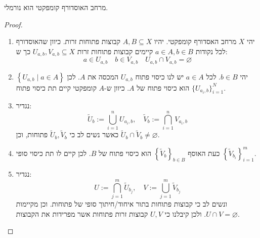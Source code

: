 \documentclass{tstextbook}
\begin{document}
\begin{proposition}
מרחב האוסדורף קומפקטי הוא נורמלי.

\end{proposition}
\begin{proof}
  \begin{enumerate}
    \item יהי \(X\) מרחב האסדורף קומפקטי. יהיו \(A,B\subseteq X\) קבוצות פתוחות זרות. כיוון שהאוסדורף לכל נקודות \(a\in A,b \in B\) קיימים קבוצות פתוחות זרות \(U_{a,b},V_{a,b}\subseteq X\) כך ש: 
$$a\in U_{a,b}\quad b\in V_{a,b}\quad U_{a,b}\cap V_{a,b}=\varnothing $$


    \item יהי \(b \in B\). לכל \(a \in A\) יש לנו כיסוי פתוח \(U_{a,b}\) המכסה את \(A\). לכן \(\left\{  U_{a,b}\mid a \in A  \right\}\) הוא כיסוי פתוח של \(A\). כיוון ש-\(A\) קומפקטי קיים תת כיסוי פתוח \(\{ U_{a_{i},b} \}_{i=1}^{N}\).  


    \item נגדיר: 
$$\tilde{U}_{b}:=\bigcup_{i=1}^{n}U_{a_{i},b},\quad\tilde{V}_{b}:=\bigcap_{i=1}^{n}V_{a_{i},b}$$
כאשר נשים לב כי \(\tilde{U}_{b},\tilde{V}_{b}\) פתוחות, וכן \(\tilde{U}_{b}\cap \tilde{V}_{b}\neq \varnothing\).


    \item כעת האוסף \(\left\{  \tilde{V}_{b}  \right\}_{b \in B}\) הוא כיסוי פתוח של \(B\). לכן קיים לו תת כיסוי סופי \(\left\{  \tilde{V}_{b_{i}}  \right\}_{i=1}^{m}\). 


    \item נגדיר: 
$$U:=\bigcap_{j=1}^{m}\tilde{U}_{b_{j}},\quad V:=\bigcup_{j=1}^{m}\tilde{V}_{b_{j}}$$
ונשים לב כי קבוצות פתוחות בתור איחוד/חיתוך סופי של פתוחות. וכן מקיימות \(U\cap V=\varnothing\). ולכן קיבלנו כי \(U,V\) קבוצות זרות פתוחות אשר מפרידות את הקבוצות.


  \end{enumerate}
\end{proof}
\end{document}
